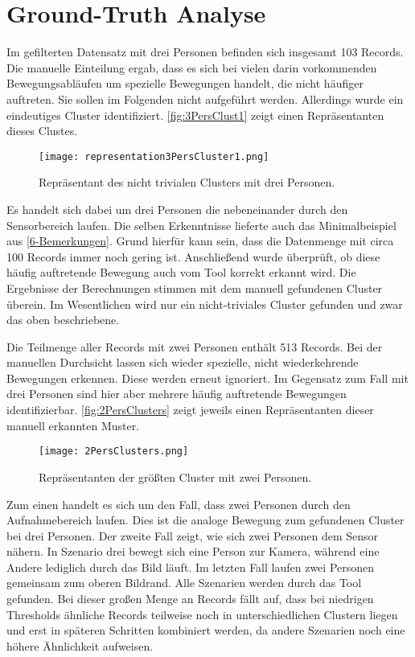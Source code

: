 \section{Ground-Truth Analyse}
\label{6-GroundTruth}
Im gefilterten Datensatz mit drei Personen befinden sich insgesamt 103 Records.
Die manuelle Einteilung ergab,
dass es sich bei vielen darin vorkommenden Bewegungsabläufen
um spezielle Bewegungen handelt, die nicht häufiger auftreten.
Sie sollen im Folgenden nicht aufgeführt werden.
Allerdings wurde ein eindeutiges Cluster identifiziert.
\autoref{fig:3PersClust1} zeigt einen Repräsentanten dieses Clustes.
\begin{figure}[ht]
    \begin{center}
    \texttt{[image: representation3PersCluster1.png]}
    \end{center}
    \caption{Repräsentant des nicht trivialen Clusters mit drei Personen.}
    \label{fig:3PersClust1}
\end{figure}
Es handelt sich dabei um drei Personen die nebeneinander durch den Sensorbereich laufen.
Die selben Erkenntnisse lieferte auch das Minimalbeispiel aus \autoref{6-Bemerkungen}.
Grund hierfür kann sein, dass die Datenmenge mit circa 100 Records immer noch gering ist.
Anschließend wurde überprüft, ob diese häufig auftretende Bewegung auch
vom Tool korrekt erkannt wird.
Die Ergebnisse der Berechnungen stimmen mit dem manuell gefundenen Cluster überein.
Im Wesentlichen wird nur ein nicht-triviales Cluster gefunden
und zwar das oben beschriebene.

Die Teilmenge aller Records mit zwei Personen enthält 513 Records.
Bei der manuellen Durchsicht lassen sich wieder spezielle,
nicht wiederkehrende Bewegungen erkennen.
Diese werden erneut ignoriert.
Im Gegensatz zum Fall mit drei Personen sind hier aber mehrere häufig auftretende Bewegungen identifizierbar.
\autoref{fig:2PersClusters} zeigt jeweils einen Repräsentanten dieser manuell erkannten Muster.
\begin{figure}[ht]
    \begin{center}
    \texttt{[image: 2PersClusters.png]}
    \end{center}
    \caption{Repräsentanten der größten Cluster mit zwei Personen.}
    \label{fig:2PersClusters}
\end{figure}
Zum einen handelt es sich um den Fall, dass zwei Personen durch den Aufnahmebereich laufen.
Dies ist die analoge Bewegung zum gefundenen Cluster bei drei Personen.
Der zweite Fall zeigt, wie sich zwei Personen dem Sensor nähern.
In Szenario drei bewegt sich eine Person zur Kamera,
während eine Andere lediglich durch das Bild läuft.
Im letzten Fall laufen zwei Personen gemeinsam zum oberen Bildrand.
Alle Szenarien werden durch das Tool gefunden.
Bei dieser großen Menge an Records fällt auf,
dass bei niedrigen Thresholds ähnliche Records teilweise noch in unterschiedlichen Clustern liegen
und erst in späteren Schritten kombiniert werden,
da andere Szenarien noch eine höhere Ähnlichkeit aufweisen.

